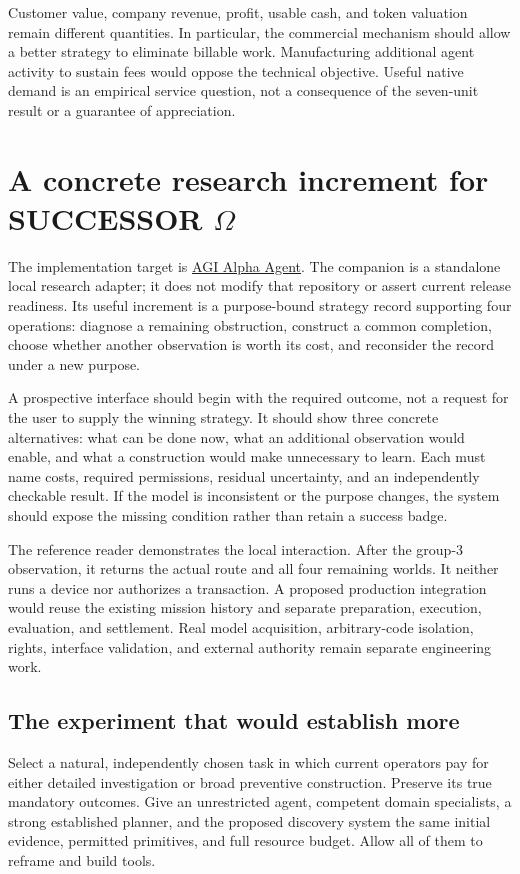 \documentclass[11pt,letterpaper]{article}
\theoremstyle{remark}\newtheorem{remark}{Remark}[section]
\begin{document}
Customer value, company revenue, profit, usable cash, and token valuation remain different quantities. In particular, the commercial mechanism should allow a better strategy to eliminate billable work. Manufacturing additional agent activity to sustain fees would oppose the technical objective. Useful native demand is an empirical service question, not a consequence of the seven-unit result or a guarantee of appreciation.

\section{A concrete research increment for SUCCESSOR \texorpdfstring{$\Omega$}{Omega}}
\label{sec:implementation}
The implementation target is \href{https://github.com/MontrealAI/AGI-Alpha-Agent-v0}{AGI Alpha Agent}. The companion is a standalone local research adapter; it does not modify that repository or assert current release readiness. Its useful increment is a purpose-bound strategy record supporting four operations: diagnose a remaining obstruction, construct a common completion, choose whether another observation is worth its cost, and reconsider the record under a new purpose.

A prospective interface should begin with the required outcome, not a request for the user to supply the winning strategy. It should show three concrete alternatives: what can be done now, what an additional observation would enable, and what a construction would make unnecessary to learn. Each must name costs, required permissions, residual uncertainty, and an independently checkable result. If the model is inconsistent or the purpose changes, the system should expose the missing condition rather than retain a success badge.

The reference reader demonstrates the local interaction. After the group-3 observation, it returns the actual route and all four remaining worlds. It neither runs a device nor authorizes a transaction. A proposed production integration would reuse the existing mission history and separate preparation, execution, evaluation, and settlement. Real model acquisition, arbitrary-code isolation, rights, interface validation, and external authority remain separate engineering work.

\subsection{The experiment that would establish more}
Select a natural, independently chosen task in which current operators pay for either detailed investigation or broad preventive construction. Preserve its true mandatory outcomes. Give an unrestricted agent, competent domain specialists, a strong established planner, and the proposed discovery system the same initial evidence, permitted primitives, and full resource budget. Allow all of them to reframe and build tools.
\end{document}
